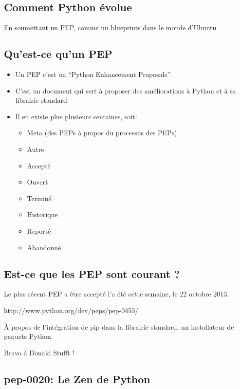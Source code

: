 \documentclass[letterpaper,10pt,english]{/Users/mlhamel/venv/apius/lib/python2.7/site-packages/sphinx/texinputs/sphinxhowto}
\begin{document}
        
    
\subsection{Comment Python évolue}\label{comment-python-évolue}

En soumettant un PEP, comme un blueprints dans le monde d'Ubuntu\subsection{Qu'est-ce qu'un PEP}\label{quest-ce-quun-pep}

\begin{itemize}
\item
  Un PEP c'est un ``Python Enhancement Proposals''
\item
  C'est un document qui sert à proposer des améliorations à Python et à
  sa librairie standard
\item
  Il en existe plus plusieurs centaines, soit:

  \begin{itemize}
  \itemsep1pt\parskip0pt
  \item
    Meta (des PEPs à propos du processus des PEPs)
  \item
    Autre
  \item
    Accepté
  \item
    Ouvert
  \item
    Terminé
  \item
    Historique
  \item
    Reporté
  \item
    Abandonné
  \end{itemize}
\end{itemize}\subsection{Est-ce que les PEP sont courant
?}\label{est-ce-que-les-pep-sont-courant}

Le plus récent PEP a être accepté l'a été cette semaine, le 22 octobre
2013.

http://www.python.org/dev/peps/pep-0453/

À propos de l'intégration de pip dans la librairie standard, un
installateur de paquets Python.

Bravo à Donald Stufft !\subsection{pep-0020: Le Zen de Python}\label{pep-0020-le-zen-de-python}
\end{document}
